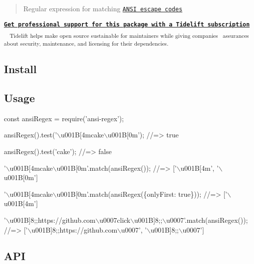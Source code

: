 \begin{quote}
Regular expression for matching \href{https://en.wikipedia.org/wiki/ANSI_escape_code}{\tt A\+N\+SI escape codes} \end{quote}




 {\bfseries  \href{https://tidelift.com/subscription/pkg/npm-ansi-regex?utm_source=npm-ansi-regex&utm_medium=referral&utm_campaign=readme}{\tt Get professional support for this package with a Tidelift subscription} } ~\newline
 \textsubscript{ Tidelift helps make open source sustainable for maintainers while giving companies~\newline
assurances about security, maintenance, and licensing for their dependencies. }  



\subsection*{Install}




\subsection*{Usage}


\begin{DoxyCode}
const ansiRegex = require('ansi-regex');

ansiRegex().test('\(\backslash\)u001B[4mcake\(\backslash\)u001B[0m');
//=> true

ansiRegex().test('cake');
//=> false

'\(\backslash\)u001B[4mcake\(\backslash\)u001B[0m'.match(ansiRegex());
//=> ['\(\backslash\)u001B[4m', '\(\backslash\)u001B[0m']

'\(\backslash\)u001B[4mcake\(\backslash\)u001B[0m'.match(ansiRegex(\{onlyFirst: true\}));
//=> ['\(\backslash\)u001B[4m']

'\(\backslash\)u001B]8;;https://github.com\(\backslash\)u0007click\(\backslash\)u001B]8;;\(\backslash\)u0007'.match(ansiRegex());
//=> ['\(\backslash\)u001B]8;;https://github.com\(\backslash\)u0007', '\(\backslash\)u001B]8;;\(\backslash\)u0007']
\end{DoxyCode}


\subsection*{A\+PI}

